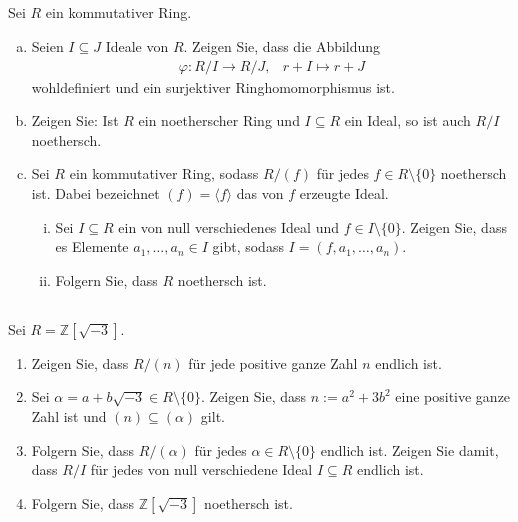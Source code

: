 \documentclass{article}
\newcommand{\Z}{\mathbb{Z}}
\begin{document}
\subsection{}
\color{blue}
Sei $R$ ein kommutativer Ring.
\color{black}
\begin{enumerate}[(a)]
    \item
        \color{blue}
        Seien $I\subseteq J$ Ideale von $R$. Zeigen Sie, dass die Abbildung
        \begin{align*}
            \varphi:R/I\to R/J,&r+I\mapsto r+J
        \end{align*}
        wohldefiniert und ein surjektiver Ringhomomorphismus ist.
        \color{black}
    \item
        \color{blue}
        Zeigen Sie: Ist $R$ ein noetherscher Ring und $I\subseteq R$ ein Ideal, so ist auch $R/I$
        noethersch.
        \color{black}
    \item
        \color{blue}
        Sei $R$ ein kommutativer Ring, sodass $R/(f)$ für jedes $f\in R\setminus\{0\}$ noethersch ist.
        Dabei bezeichnet $(f)=\langle f\rangle$ das von $f$ erzeugte Ideal.
        \color{black}
        \begin{enumerate}[(i)]
            \item
                \color{blue}
                Sei $I\subseteq R$ ein von null verschiedenes Ideal und $f\in I\setminus\{0\}$. Zeigen Sie, dass es
                Elemente $a_1,\hdots,a_n\in I$ gibt, sodass $I=(f,a_1,\hdots,a_n)$.
                \color{black}
            \item
                \color{blue}
                Folgern Sie, dass $R$ noethersch ist.
                \color{black}
        \end{enumerate}
\end{enumerate}
\subsection{}
\color{blue}
Sei $R=\Z[\sqrt{-3}]$.
\color{black}
\begin{enumerate}
    \item
        \color{blue}
        Zeigen Sie, dass $R/(n)$ für jede positive ganze Zahl $n$ endlich ist.
        \color{black}
    \item
        \color{blue}
        Sei $\alpha=a+b\sqrt{-3}\in R\setminus\{0\}$. Zeigen Sie, dass $n:=a^2 + 3b^2$
        eine positive ganze Zahl ist und $(n)\subseteq(\alpha)$ gilt.
        \color{black}
    \item
        \color{blue}
        Folgern Sie, dass $R/(\alpha)$ für jedes $\alpha\in R\setminus\{0\}$ endlich ist. Zeigen Sie damit,
        dass $R/I$ für jedes von null verschiedene Ideal $I\subseteq R$ endlich ist.
        \color{black}
    \item
        \color{blue}
        Folgern Sie, dass $\Z[\sqrt{-3}]$ noethersch ist.
        \color{black}
\end{enumerate}
\end{document}

